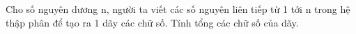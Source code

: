 Cho số nguyên dương n, người ta viết các số nguyên liên tiếp từ 1 tới n trong hệ thập phân để tạo ra 1 dãy các chữ số. Tính tổng các chữ số của dãy.